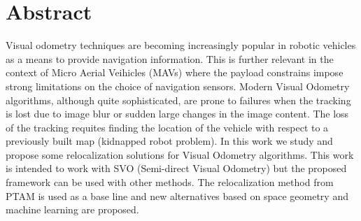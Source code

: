 
 \setcounter{tocdepth}{2}
 \tableofcontents
 \cleardoublepage






\chapter*{Abstract}

Visual odometry techniques are becoming increasingly popular in robotic vehicles as a means to provide navigation information. This is further relevant in the context of Micro Aerial Veihicles (MAVs) where the payload constrains impose strong limitations on the choice of navigation sensors.  
Modern Visual Odometry algorithms, although quite sophisticated, are prone to failures when the tracking is lost due to image blur or sudden large changes in the image content.  
The loss of the tracking requites finding the location of the vehicle with respect to a previously built map (kidnapped robot problem). In this work we study and propose some relocalization solutions for Visual Odometry algorithms. This work is intended to work with SVO (Semi-direct Visual Odometry) but the proposed framework can be used with other methods. The relocalization method from PTAM is used as a base line and new alternatives based on space geometry and machine learning are proposed.

\cleardoublepage


